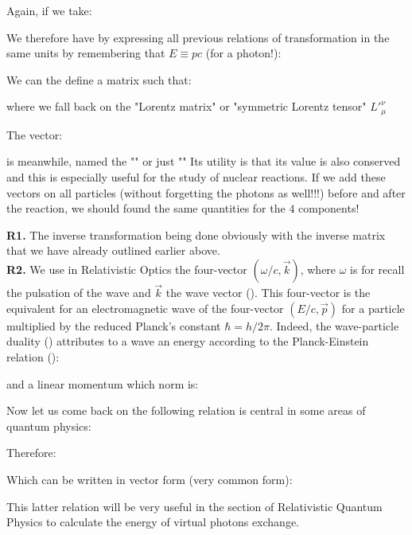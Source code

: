	Again, if we take:
	

	We therefore have by expressing all previous relations of transformation in the same units by remembering that $E\equiv pc$ (for a photon!):
	
	We can the define a matrix such that:
	
	where we fall back on the "Lorentz matrix" or "symmetric Lorentz tensor" ${L'}_\mu^\nu$

	The vector:
	
	is meanwhile, named the "\label{four momentum}" or just "" Its utility is that its value is also conserved and this is especially useful for the study of nuclear reactions. If we add these vectors on all particles (without forgetting the photons as well!!!) before and after the reaction, we should found the same quantities for the $4$ components!
	\begin{tcolorbox}[title=Remarks,colframe=black,arc=10pt]
	\textbf{R1.} The inverse transformation being done obviously with the inverse matrix that we have already outlined earlier above.\\
	
	\textbf{R2.} We use in Relativistic Optics the four-vector $(\omega/c,\vec{k})$, where $\omega$ is for recall the pulsation of the wave and $\vec{k}$ the wave vector (). This four-vector is the equivalent for an electromagnetic wave of the four-vector $(E/c,\vec{p})$ for a particle multiplied by the reduced Planck's constant $\hbar=h/2\pi$. Indeed, the wave-particle duality () attributes to a wave an energy\label{wave number special relativity} according to the Planck-Einstein relation ():
	
	and a linear momentum which norm is:
	
	\end{tcolorbox}
	Now let us come back on the following relation is central in some areas of quantum physics:
	
	Therefore:
	
	Which can be written in vector form (very common form):
	
	This latter relation will be very useful in the section of Relativistic Quantum Physics to calculate the energy of virtual photons exchange.

